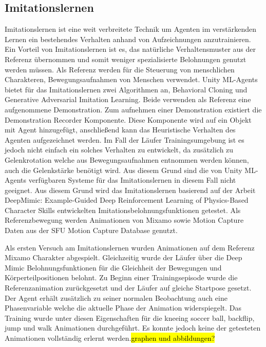 \subsection{Imitationslernen}
Imitationslernen ist eine weit verbreitete Technik um Agenten im verstärkenden Lernen ein bestehendes Verhalten anhand von Aufzeichnungen anzutrainieren. Ein Vorteil von Imitationslernen ist es, das natürliche Verhaltensmuster aus der Referenz übernommen und somit weniger spezialisierte Belohnungen genutzt werden müssen. Als Referenz werden für die Steuerung von menschlichen Charakteren, Bewegungsaufnahmen von Menschen verwendet. Unity ML-Agents bietet für das Imitationslernen zwei Algorithmen an, Behavioral Cloning und Generative Adversarial Imitation Learning. Beide verwenden als Referenz eine aufgenommene Demonstration. Zum aufnehmen einer Demonstration existiert die Demonstration Recorder Komponente. Diese Komponente wird auf ein Objekt mit Agent hinzugefügt, anschließend kann das Heuristische Verhalten des Agenten aufgezeichnet werden. Im Fall der Läufer Trainingsumgebung ist es jedoch nicht einfach ein solches Verhalten zu entwickelt, da zusätzlich zu Gelenkrotation welche aus Bewegungsaufnahmen entnommen werden können, auch die Gelenkstärke benötigt wird. Aus diesem Grund sind die von Unity ML-Agents verfügbaren Systeme für das Imitationslernen in diesem Fall nicht geeignet. Aus diesem Grund wird das Imitationslernen basierend auf der Arbeit \grqq{}DeepMimic: Example-Guided Deep Reinforcement Learning of Physics-Based Character Skills\grqq{} entwickelten Imitationsbelohnungsfunktionen getestet.\cite{peng2018deepmimic} Als Referenzbewegung werden Animationen von Mixamo sowie Motion Capture Daten aus der \grqq{}SFU Motion Capture Database\grqq{} genutzt.\cite{sfu-motion-capture}

Als ersten Versuch am Imitationslernen wurden Animationen auf dem Referenz Mixamo Charakter abgespielt. Gleichzeitig wurde der Läufer über die Deep Mimic Belohnungsfunktionen für die Gleichheit der Bewegungen und Körperteilpositionen belohnt. Zu Beginn einer Trainingsepisode wurde die Referenzanimation zurückgesetzt und der Läufer auf gleiche Startpose gesetzt. Der Agent erhält zusätzlich zu seiner normalen Beobachtung auch eine Phasenvariable welche die aktuelle Phase der Animation widerspiegelt. Das Training wurde unter diesen Eigenschaften für die \grqq{}kneeing soccer ball\grqq{}, \grqq{}backflip\grqq{}, \grqq{}jump\grqq{} und \grqq{}walk\grqq{} Animationen durchgeführt. Es konnte jedoch keine der getesteten Animationen vollständig erlernt werden.\hl{graphen und abbildungen?}

